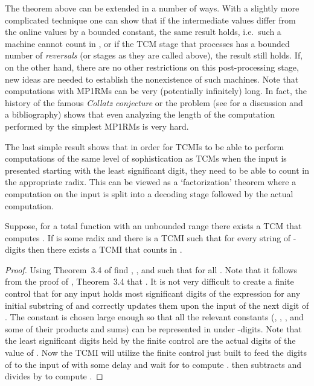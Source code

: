 \documentclass[12pt]{article}
\begin{document}
The theorem above can be extended in a number of ways. With a slightly
more complicated technique one can show that if the intermediate
values differ from the online values by a bounded constant, the same
result holds, i.e.~such a machine cannot count in , or if the
TCM stage that processes  has a bounded number of {\it
  reversals\/} (or stages as they are called above), the result still
holds. If, on the other hand, there are no other restrictions on this
post-processing stage, new ideas are needed to establish the
nonexistence of such machines. Note that computations
with MP1RMs can be very (potentially infinitely) long. In fact, the history
of the famous {\it Collatz conjecture\/} or the  problem (see
\cite{Leht} for a discussion and a bibliography) shows that
even analyzing the length of the computation performed by the simplest
MP1RMs is very hard.

The last simple result shows that in order for TCMIs to be able to
perform computations of the same level of sophistication as TCMs
when the input is presented starting with the least significant digit,
they need to be able to count in the appropriate radix. This can be
viewed as a `factorization' theorem where a computation on the input
is split into a decoding stage followed by the actual computation.
\begin{theorem}\label{mmach}
Suppose, for a total function  with an unbounded range there exists a
TCM  that computes . If  is some radix and there is a TCMI  such that
 for
every string of -digits then there
exists a TCMI  that counts in . 
\end{theorem}
\begin{proof}
Using Theorem~3.4 of \cite{ibarra} find , , and  such that
 for all . Note that it follows from the proof of
\cite{ibarra}, Theorem~3.4 that . It is not very difficult to create a finite
control that for any input  holds  most significant digits of the expression
 for any initial substring  of  and
correctly updates them upon the input of 
the next digit  of . The constant  is chosen large enough so
that all the relevant constants (, , ,  and some of
their products and sums) can be represented in under 
-digits. Note that the  least significant digits held by the
finite control are the actual digits of the value of . Now the TCMI  will utilize the finite control just
built to feed the digits of  to the input of
 with some delay and wait for  to compute .  then subtracts 
and divides by  to compute .
\end{proof}
\end{document}

